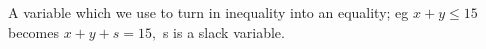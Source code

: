  A variable which we use to turn in inequality into an
equality; eg $ x + y \leq 15 $ becomes $ x + y + s = 15 , $
s is a slack variable.
